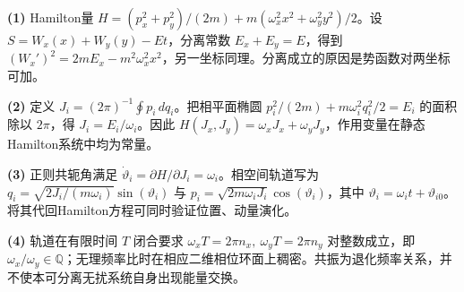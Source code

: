 \par\noindent\textbf{(1)} Hamilton量 \(H=(p_x^2+p_y^2)/(2m)+m(\omega_x^2x^2+\omega_y^2y^2)/2\)。设 \(S=W_x(x)+W_y(y)-Et\)，分离常数 \(E_x+E_y=E\)，得到 \((W_x')^2=2mE_x-m^2\omega_x^2x^2\)，另一坐标同理。分离成立的原因是势函数对两坐标可加。
\par\noindent\textbf{(2)} 定义 \(J_i=(2\pi)^{-1}\oint p_i\,dq_i\)。把相平面椭圆 \(p_i^2/(2m)+m\omega_i^2q_i^2/2=E_i\) 的面积除以 \(2\pi\)，得 \(J_i=E_i/\omega_i\)。因此 \(H(J_x,J_y)=\omega_xJ_x+\omega_yJ_y\)，作用变量在静态Hamilton系统中均为常量。
\par\noindent\textbf{(3)} 正则共轭角满足 \(\dot\vartheta_i=\partial H/\partial J_i=\omega_i\)。相空间轨道写为 \(q_i=\sqrt{2J_i/(m\omega_i)}\sin(\vartheta_i)\) 与 \(p_i=\sqrt{2m\omega_iJ_i}\cos(\vartheta_i)\)，其中 \(\vartheta_i=\omega_it+\vartheta_{i0}\)。将其代回Hamilton方程可同时验证位置、动量演化。
\par\noindent\textbf{(4)} 轨道在有限时间 \(T\) 闭合要求 \(\omega_xT=2\pi n_x,\ \omega_yT=2\pi n_y\) 对整数成立，即 \(\omega_x/\omega_y\in\mathbb Q\)；无理频率比时在相应二维相位环面上稠密。共振为退化频率关系，并不使本可分离无扰系统自身出现能量交换。
